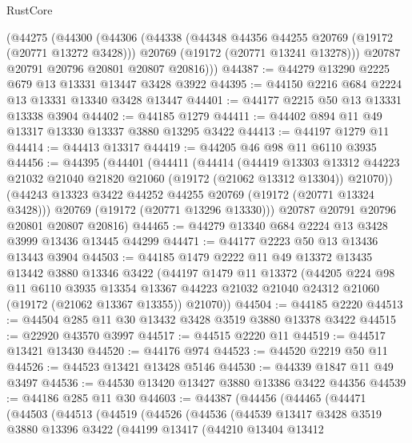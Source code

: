 \begin{lexlean}{RustCore}
\begin{coremodule}
    (@44275
      (@44300
        (@44306
          (@44338
            (@44348 @44356 @44255 @20769 (@19172 (@20771 @13272 @3428)))
            @20769
            (@19172 (@20771 @13241 @13278)))
          @20787
          @20791
          @20796
          @20801
          @20807
          @20816)))
@44387 := @44279 @13290 @2225 @679 @13 @13331 @13447 @3428 @3922
@44395 := @44150 @2216 @684 @2224 @13 @13331 @13340 @3428 @13447
@44401 := @44177 @2215 @50 @13 @13331 @13338 @3904
@44402 := @44185 @1279
@44411 := @44402 @894 @11 @49 @13317 @13330 @13337 @3880 @13295 @3422
@44413 := @44197 @1279 @11
@44414 := @44413 @13317
@44419 := @44205 @46 @98 @11 @6110 @3935
@44456 := @44395
    (@44401
      (@44411
        (@44414
          (@44419
            @13303
            @13312
            @44223
            @21032
            @21040
            @21820
            @21060
            (@19172 (@21062 @13312 @13304))
            @21070))
        (@44243 @13323 @3422 @44252 @44255 @20769 (@19172 (@20771 @13324 @3428)))
        @20769
        (@19172 (@20771 @13296 @13330)))
      @20787
      @20791
      @20796
      @20801
      @20807
      @20816)
@44465 := @44279 @13340 @684 @2224 @13 @3428 @3999 @13436 @13445 @44299
@44471 := @44177 @2223 @50 @13 @13436 @13443 @3904
@44503 := @44185
    @1479
    @2222
    @11
    @49
    @13372
    @13435
    @13442
    @3880
    @13346
    @3422
    (@44197
      @1479
      @11
      @13372
      (@44205
        @224
        @98
        @11
        @6110
        @3935
        @13354
        @13367
        @44223
        @21032
        @21040
        @24312
        @21060
        (@19172 (@21062 @13367 @13355))
        @21070))
@44504 := @44185 @2220
@44513 := @44504 @285 @11 @30 @13432 @3428 @3519 @3880 @13378 @3422
@44515 := @22920 @43570 @3997
@44517 := @44515 @2220 @11
@44519 := @44517 @13421 @13430
@44520 := @44176 @974
@44523 := @44520 @2219 @50 @11
@44526 := @44523 @13421 @13428 @5146
@44530 := @44339 @1847 @11 @49 @3497
@44536 := @44530 @13420 @13427 @3880 @13386 @3422 @44356
@44539 := @44186 @285 @11 @30
@44603 := @44387
    (@44456
      (@44465
        (@44471
          (@44503
            (@44513
              (@44519
                (@44526
                  (@44536
                    (@44539
                      @13417
                      @3428
                      @3519
                      @3880
                      @13396
                      @3422
                      (@44199
                        @13417
                        (@44210
                          @13404
                          @13412

\end{coremodule}
\end{lexlean}
